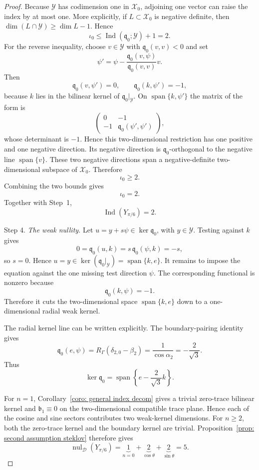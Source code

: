 \documentclass[11pt,twoside]{amsart}
\numberwithin{equation}{section}
\begin{document}
\begin{proof}
Because $\mathcal Y$ has codimension one in $\mathcal X_0$, adjoining one vector can raise the index by at most one. More explicitly, if $L\subset\mathcal X_0$ is negative definite, then $\dim(L\cap\mathcal Y)\ge\dim L-1$. Hence
\[
\iota_0\le
\operatorname{Ind}(\mathfrak q_0;\mathcal Y)+1=2.
\]
For the reverse inequality, choose $v\in\mathcal Y$ with $\mathfrak q_0(v,v)<0$ and set
\[
\psi'
=\psi-
\frac{\mathfrak q_0(v,\psi)}{\mathfrak q_0(v,v)}v.
\]
Then
\[
\mathfrak q_0(v,\psi')=0,
\qquad
\mathfrak q_0(k,\psi')=-1,
\]
because $k$ lies in the bilinear kernel of $\mathfrak q_0|_{\mathcal Y}$. On $\operatorname{span}\{k,\psi'\}$ the matrix of the form is
\[
\begin{pmatrix}
0&-1\\
-1&\mathfrak q_0(\psi',\psi')
\end{pmatrix},
\]
whose determinant is $-1$. Hence this two-dimensional restriction has one positive and one negative direction. Its negative direction is $\mathfrak q_0$-orthogonal to the negative line $\operatorname{span}\{v\}$. These two negative directions span a negative-definite two-dimensional subspace of $\mathcal X_0$. Therefore
\[
\iota_0\ge2.
\]
Combining the two bounds gives
\[
\iota_0=2.
\]
Together with Step~1,
\[
\operatorname{Ind}(Y_{\pi/6})=2.
\]

\medskip
\noindent Step 4. \emph{The weak nullity.}
Let $u=y+s\psi\in\ker\mathfrak q_0$, with $y\in\mathcal Y$. Testing against $k$ gives
\[
0=\mathfrak q_0(u,k)
=s\,\mathfrak q_0(\psi,k)=-s,
\]
so $s=0$. Hence $u=y\in\ker(\mathfrak q_0|_{\mathcal Y})=\operatorname{span}\{k,e\}$. It remains to impose the equation against the one missing test direction $\psi$. The corresponding functional is nonzero because
\[
\mathfrak q_0(k,\psi)=-1.
\]
Therefore it cuts the two-dimensional space $\operatorname{span}\{k,e\}$ down to a one-dimensional radial weak kernel.

The radial kernel line can be written explicitly. The boundary-pairing identity gives
\[
\mathfrak q_0(e,\psi)
=R_\Gamma(\delta_{2,0}-\beta_2)
=\frac{1}{\cos\alpha_2}
=-\frac{2}{\sqrt3}.
\]
Thus
\[
\ker\mathfrak q_0
=\operatorname{span}\left\{e-\frac{2}{\sqrt3}k\right\}.
\]

For $n=1$, Corollary~\ref{coro: general index decom} gives a trivial zero-trace bilinear kernel and $\mathfrak b_1\equiv0$ on the two-dimensional compatible trace plane. Hence each of the cosine and sine sectors contributes two weak-kernel dimensions. For $n\ge2$, both the zero-trace kernel and the boundary kernel are trivial. Proposition~\ref{prop: second assumption steklov} therefore gives
\[
\operatorname{nul}_{\mathcal D}(Y_{\pi/6})
=\underbrace{1}_{n=0}
+\underbrace{2}_{\cos\theta}
+\underbrace{2}_{\sin\theta}
=5.
\]
\end{proof}
\end{document}
